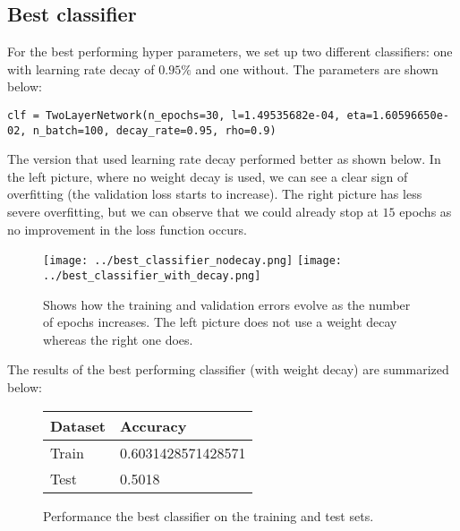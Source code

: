 \documentclass[10pt,a4paper]{article}
\begin{document}
\subsection*{Best classifier}
For the best performing hyper parameters, we set up two different classifiers: one with learning rate decay of $0.95\%$ and one without. The parameters are shown below:
\begin{lstlisting}[breaklines]
clf = TwoLayerNetwork(n_epochs=30, l=1.49535682e-04, eta=1.60596650e-02, n_batch=100, decay_rate=0.95, rho=0.9)
\end{lstlisting}
The version that used learning rate decay performed better as shown below. In the left picture, where no weight decay is used, we can see a clear sign of overfitting (the validation loss starts to increase). The right picture has less severe overfitting, but we can observe that we could already stop at $15$ epochs as no improvement in the loss function occurs.
\begin{figure}[H]
	\texttt{[image: ../best\_classifier\_nodecay.png]}
	\texttt{[image: ../best\_classifier\_with\_decay.png]}
	\caption{Shows how the training and validation errors evolve as the number of epochs increases. The left picture does not use a weight decay whereas the right one does.}
\end{figure}

The results of the best performing classifier (with weight decay) are summarized below:
\begin{figure}[H]
	\centering
	\begin{tabular}{|l|l|}
		\hline
		Dataset & Accuracy \\
		\hline
		Train & 0.6031428571428571 \\
		Test & 0.5018\\
		\hline
	\end{tabular}
\caption{Performance the best classifier on the training and test sets.}
\end{figure}
\end{document}

